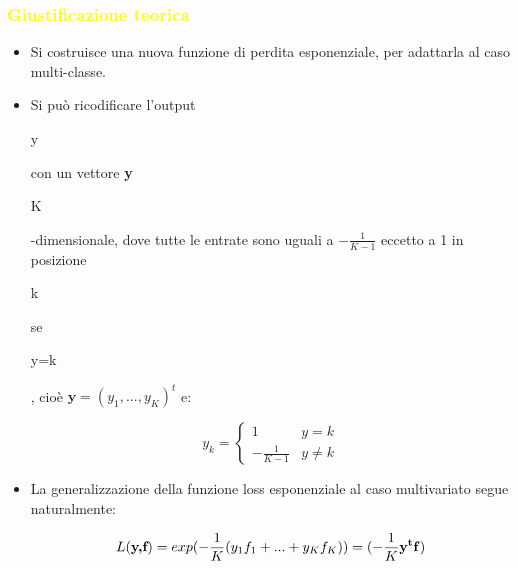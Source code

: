 \documentclass[handout
]{beamer}
\def\yellow#1{{\textcolor{yellow}{#1}}}
\begin{document}
\begin{frame}
\frametitle{\yellow{Giustificazione teorica}}
\begin{itemize}
 \item Si costruisce una nuova funzione di perdita esponenziale, per adattarla al caso multi-classe.
 \item Si pu\`o ricodificare l'output \begin{it}y\end{it} 
con un vettore \textbf{y} \begin{it}K\end{it}-dimensionale, 
dove tutte le entrate sono uguali a \begin{math}-\frac{1}{K-1} \end{math}
 eccetto a 1 in posizione \begin{it}k \end{it} se \begin{it}y=k\end{it}, 
cio\`e \begin{math} \textbf{y} =(y_1,...,y_K)^t\end{math} e:
\begin{center}
 \begin{equation}\label{eq:vet_mc}
 y_k=\begin{cases}1 & y=k\\
-\frac{1}{K-1} & y\ne k\end{cases}
\end{equation}
\end{center}
\item La generalizzazione della funzione loss esponenziale al caso multivariato segue naturalmente:
 \begin{center}
 \begin{equation} \label{eq:loss_mc}
L(\textbf{y,f}) =
exp(-\frac{1}{K}(y_1f_1 + ... + y_Kf_K)) = (-\frac{1}{K}\begin{bf}y^tf\end{bf})
\end{equation}
\end{center}
\end{itemize}
\end{frame}
\end{document}
